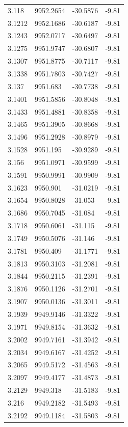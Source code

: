 \begin{table}[H]
\begin{tabular}{llll}
3.118 & 9952.2654 & -30.5876 & -9.81 \\
3.1212 & 9952.1686 & -30.6187 & -9.81 \\
3.1243 & 9952.0717 & -30.6497 & -9.81 \\
3.1275 & 9951.9747 & -30.6807 & -9.81 \\
3.1307 & 9951.8775 & -30.7117 & -9.81 \\
3.1338 & 9951.7803 & -30.7427 & -9.81 \\
3.137 & 9951.683 & -30.7738 & -9.81 \\
3.1401 & 9951.5856 & -30.8048 & -9.81 \\
3.1433 & 9951.4881 & -30.8358 & -9.81 \\
3.1465 & 9951.3905 & -30.8668 & -9.81 \\
3.1496 & 9951.2928 & -30.8979 & -9.81 \\
3.1528 & 9951.195 & -30.9289 & -9.81 \\
3.156 & 9951.0971 & -30.9599 & -9.81 \\
3.1591 & 9950.9991 & -30.9909 & -9.81 \\
3.1623 & 9950.901 & -31.0219 & -9.81 \\
3.1654 & 9950.8028 & -31.053 & -9.81 \\
3.1686 & 9950.7045 & -31.084 & -9.81 \\
3.1718 & 9950.6061 & -31.115 & -9.81 \\
3.1749 & 9950.5076 & -31.146 & -9.81 \\
3.1781 & 9950.409 & -31.1771 & -9.81 \\
3.1813 & 9950.3103 & -31.2081 & -9.81 \\
3.1844 & 9950.2115 & -31.2391 & -9.81 \\
3.1876 & 9950.1126 & -31.2701 & -9.81 \\
3.1907 & 9950.0136 & -31.3011 & -9.81 \\
3.1939 & 9949.9146 & -31.3322 & -9.81 \\
3.1971 & 9949.8154 & -31.3632 & -9.81 \\
3.2002 & 9949.7161 & -31.3942 & -9.81 \\
3.2034 & 9949.6167 & -31.4252 & -9.81 \\
3.2065 & 9949.5172 & -31.4563 & -9.81 \\
3.2097 & 9949.4177 & -31.4873 & -9.81 \\
3.2129 & 9949.318 & -31.5183 & -9.81 \\
3.216 & 9949.2182 & -31.5493 & -9.81 \\
3.2192 & 9949.1184 & -31.5803 & -9.81 \\

\end{tabular}
\end{table}
